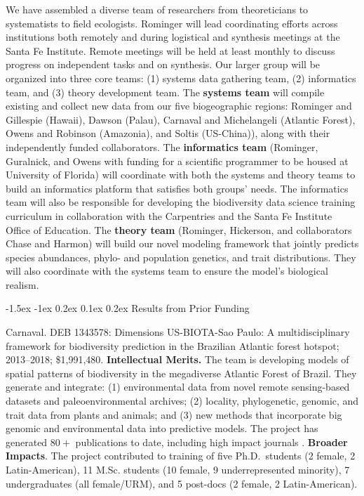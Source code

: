 \documentclass[11pt]{article}
\makeatletter
\renewcommand\section{\@startsection{section}{1}{\z@}%
                                  {-1.5ex \@plus -1ex \@minus 0.2ex}%
                                  {0.1ex \@plus 0.2ex}%
                                  {\normalfont\Large\bfseries}}
\renewcommand{\paragraph}{\@startsection{paragraph}{4}{\z@}
  {1.5ex \@plus 1ex \@minus .2ex}{-1em}
  {\normalfont\normalsize\it}
}
\makeatother
\begin{document}
We have assembled a diverse team of researchers from theoreticians to
systematists to field ecologists. Rominger will lead coordinating
efforts across institutions both remotely and during logistical and
synthesis meetings at the Santa Fe Institute. Remote meetings will be
held at least monthly to discuss progress on independent tasks and on
synthesis. Our larger group will be organized into three core teams:
(1) systems data gathering team, (2) informatics team, and (3) theory
development team. The \textbf{systems team} will compile existing and
collect new data from our five biogeographic regions: Rominger and
Gillespie (Hawaii), Dawson (Palau), Carnaval and Michelangeli
(Atlantic Forest), Owens and Robinson (Amazonia), and Soltis
(US-China)), along with their independently funded collaborators. The
\textbf{informatics team} (Rominger, Guralnick, and Owens with funding
for a scientific programmer to be housed at University of Florida)
will coordinate with both the systems and theory teams to build an
informatics platform that satisfies both groups' needs. The
informatics team will also be responsible for developing the
biodiversity data science training curriculum in collaboration with
the Carpentries and the Santa Fe Institute Office of Education. The
\textbf{theory team} (Rominger, Hickerson, and collaborators Chase and
Harmon) will build our novel modeling framework that jointly predicts
species abundances, phylo- and population genetics, and trait
distributions. They will also coordinate with the systems team to
ensure the model's biological realism.

\section{Results from Prior Funding} \label{results-from-prior-funding}

\paragraph{Carnaval.} DEB 1343578: Dimensions US-BIOTA-Sao Paulo: A
multidisciplinary framework for biodiversity prediction in the
Brazilian Atlantic forest hotspot; 2013--2018;
\$1,991,480. \textbf{Intellectual Merits.} The team is developing
models of spatial patterns of biodiversity in the megadiverse Atlantic
Forest of Brazil. They generate and integrate: (1) environmental data
from novel remote sensing-based datasets and paleoenvironmental
archives; (2) locality, phylogenetic, genomic, and trait data from
plants and animals; and (3) new methods that incorporate big genomic
and environmental data into predictive models. The project has
generated $80+$ publications to date, including high impact journals
\cite{Do_Amaral2016-bi, Prates2016-at, Prates2016-gr, Maestri2016-bp,
  Zamborlini_Saiter2016-zu, Montade2016-wl, Bernal2016-pd,
  Bustamante2016-qt, Gu2017-oz}.  \textbf{Broader Impacts}. The
project contributed to training of five Ph.D.~students (2 female, 2
Latin-American), 11 M.Sc. students (10 female, 9 underrepresented
minority), 7 undergraduates (all female/URM), and 5 post-docs (2
female, 2 Latin-American).
\end{document}
